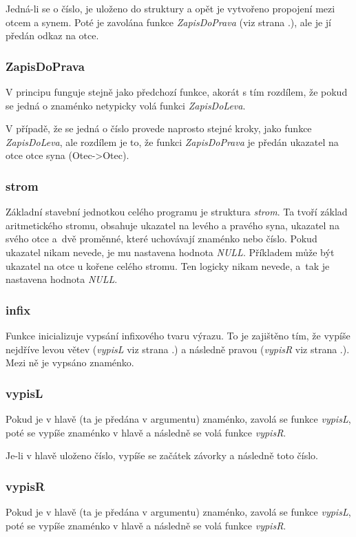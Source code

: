 \documentclass[12pt,a4paper]{report}
\begin{document}
Jedná-li se o číslo, je uloženo do struktury a opět je vytvořeno propojení mezi otcem a synem. Poté je zavolána funkce \textit{ZapisDoPrava} (viz strana \pageref{ZDP}.), ale je jí předán odkaz na otce. 
\newpage
\subsubsection{ZapisDoPrava} \label{ZDP}
V principu funguje stejně jako předchozí funkce, akorát s tím rozdílem, že pokud se jedná o znaménko netypicky volá funkci \textit{ZapisDoLeva}.  

V případě, že se jedná o číslo provede naprosto stejné kroky, jako funkce  \textit{ZapisDoLeva}, ale rozdílem je to, že funkci \textit{ZapisDoPrava} je předán ukazatel na otce otce syna (Otec->Otec).


\subsubsection{strom} \label{strom}
Základní stavební jednotkou celého programu je struktura \textit{strom}. Ta tvoří základ aritmetického stromu, obsahuje ukazatel na levého a pravého syna, ukazatel na svého otce a~dvě proměnné, které uchovávají znaménko nebo číslo. Pokud ukazatel nikam nevede, je mu nastavena hodnota \textit{NULL}. Příkladem může být ukazatel na otce u kořene celého stromu. Ten logicky nikam nevede, a~tak je nastavena hodnota \textit{NULL}. 

\subsubsection{infix} \label{infix}
Funkce inicializuje vypsání infixového tvaru výrazu. To je zajištěno tím, že vypíše nejdříve levou větev (\textit{vypisL} viz strana \pageref{vL}.) a následně pravou (\textit{vypisR} viz strana \pageref{vR}.). Mezi ně je vypsáno znaménko.

\subsubsection{vypisL} \label{vL}
Pokud je v hlavě (ta je předána v argumentu) znaménko, zavolá se funkce \textit{vypisL}, poté se vypíše znaménko v hlavě a následně se volá funkce \textit{vypisR}. 

Je-li v hlavě uloženo číslo, vypíše se začátek závorky a následně toto číslo. 

\subsubsection{vypisR} \label{vR}
Pokud je v hlavě (ta je předána v argumentu) znaménko, zavolá se funkce \textit{vypisL}, poté se vypíše znaménko v hlavě a následně se volá funkce \textit{vypisR}. 
\end{document}
